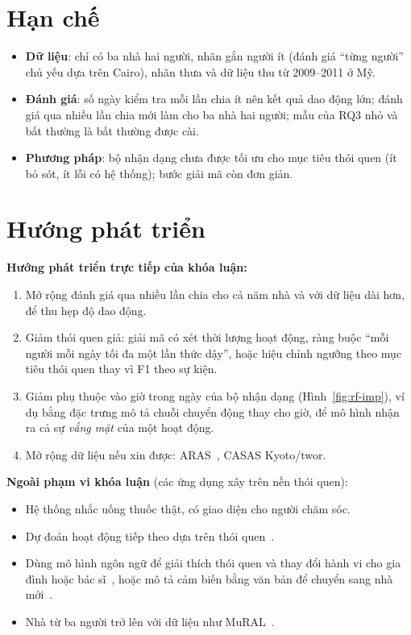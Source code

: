 \section{Hạn chế}

\begin{itemize}
  \item \textbf{Dữ liệu}: chỉ có ba nhà hai người, nhãn gắn người ít (đánh giá ``từng người'' chủ yếu dựa
  trên Cairo), nhãn thưa và dữ liệu thu từ 2009--2011 ở Mỹ.
  \item \textbf{Đánh giá}: số ngày kiểm tra mỗi lần chia ít nên kết quả dao động lớn; đánh giá qua nhiều lần
  chia mới làm cho ba nhà hai người; mẫu của RQ3 nhỏ và bất thường là bất thường được cài.
  \item \textbf{Phương pháp}: bộ nhận dạng chưa được tối ưu cho mục tiêu thói quen (ít bỏ sót, ít lỗi có hệ
  thống); bước giải mã còn đơn giản.
\end{itemize}

\section{Hướng phát triển}

\textbf{Hướng phát triển trực tiếp của khóa luận:}
\begin{enumerate}
  \item Mở rộng đánh giá qua nhiều lần chia cho cả năm nhà và với dữ liệu dài hơn, để thu hẹp độ dao động.
  \item Giảm thói quen giả: giải mã có xét thời lượng hoạt động, ràng buộc ``mỗi người mỗi ngày tối đa một
  lần thức dậy'', hoặc hiệu chỉnh ngưỡng theo mục tiêu thói quen thay vì F1 theo sự kiện.
  \item Giảm phụ thuộc vào giờ trong ngày của bộ nhận dạng (Hình~\ref{fig:rf-imp}), ví dụ bằng đặc trưng
  mô tả chuỗi chuyển động thay cho giờ, để mô hình nhận ra cả sự \emph{vắng mặt} của một hoạt động.
  \item Mở rộng dữ liệu nếu xin được: ARAS~\cite{alemdar2013aras}, CASAS Kyoto/twor.
\end{enumerate}

\textbf{Ngoài phạm vi khóa luận} (các ứng dụng xây trên nền thói quen):
\begin{itemize}
  \item Hệ thống nhắc uống thuốc thật, có giao diện cho người chăm sóc.
  \item Dự đoán hoạt động tiếp theo dựa trên thói quen~\cite{doctorarastoo2026prediction}.
  \item Dùng mô hình ngôn ngữ để giải thích thói quen và thay đổi hành vi cho gia đình hoặc bác
  sĩ~\cite{civitarese2026xbcd}, hoặc mô tả cảm biến bằng văn bản để chuyển sang nhà
  mới~\cite{thukral2024tdost,fiori2026domusfm}.
  \item Nhà từ ba người trở lên với dữ liệu như MuRAL~\cite{chen2025mural}.
\end{itemize}

